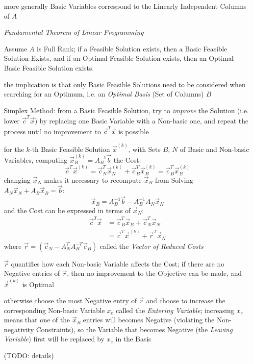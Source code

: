 more generally Basic Variables correspond to the Linearly Independent Columns
of $A$

\emph{Fundamental Theorem of Linear Programming}

Assume $A$ is Full Rank; if a Feasible Solution exists, then a Basic Feasible
Solution Exists, and if an Optimal Feasible Solution exists, then an Optimal
Basic Feasible Solution exists.

the implication is that only Basic Feasible Solutions need to be considered
when searching for an Optimum, i.e. an \emph{Optimal Basis} (Set of Columns)
$B$

Simplex Method: from a Basic Feasible Solution, try to \emph{improve} the
Solution (i.e. lower $\vec{c}^T\vec{x}$) by replacing one Basic Variable with a
Non-basic one, and repeat the process until no improvement to
$\vec{c}^T\vec{x}$ is possible

for the $k$-th Basic Feasible Solution $\vec{x}^{(k)}$, with Sets $B$, $N$ of
Basic and Non-basic Variables, computing $\vec{x}_B^{(k)} = A_B^{-1}\vec{b}$
the Cost:
\[
  \vec{c}^T\vec{x}^{(k)} =
  \vec{c}_N^T\vec{x}_N^{(k)} + \vec{c}_B^T\vec{x}_B^{(k)} =
  \vec{c}_B^T\vec{x}_B^{(k)}
\]
changing $\vec{x}_N$ makes it necessary to recompute $\vec{x}_B$ from Solving
$A_N\vec{x}_N + A_B\vec{x}_B = \vec{b}$:
\[
  \vec{x}_B = A_B^{-1}\vec{b} - A_B^{-1}A_N\vec{x}_N
\]
and the Cost can be expressed in terms of $\vec{x}_N$:
\begin{align*}
  \vec{c}^T\vec{x} & = \vec{c}_B^T\vec{x}_B + \vec{c}_N^T\vec{x}_N \\
                   & = \vec{c}^T\vec{x}^{(k)} + \vec{r}^T\vec{x}_N
\end{align*}
where $\vec{r} = (\vec{c}_N - A_N^T A_B^{-T} \vec{c}_B)$ called the \emph{Vector
  of Reduced Costs}

$\vec{r}$ quantifies how each Non-basic Variable affects the Cost; if there are
no Negative entries of $\vec{r}$, then no improvement to the Objective can be
made, and $\vec{x}^{(k)}$ is Optimal

otherwise choose the most Negative entry of $\vec{r}$ and choose to increase
the corresponding Non-basic Variable $x_e$ called the \emph{Entering Variable};
increasing $x_e$ means that one of the $\vec{x}_B$ entries will becomes
Negative (violating the Non-negativity Constraints), so the Variable that
becomes Negative (the \emph{Leaving Variable}) first will be replaced by $x_e$
in the Basis

(TODO: details)

